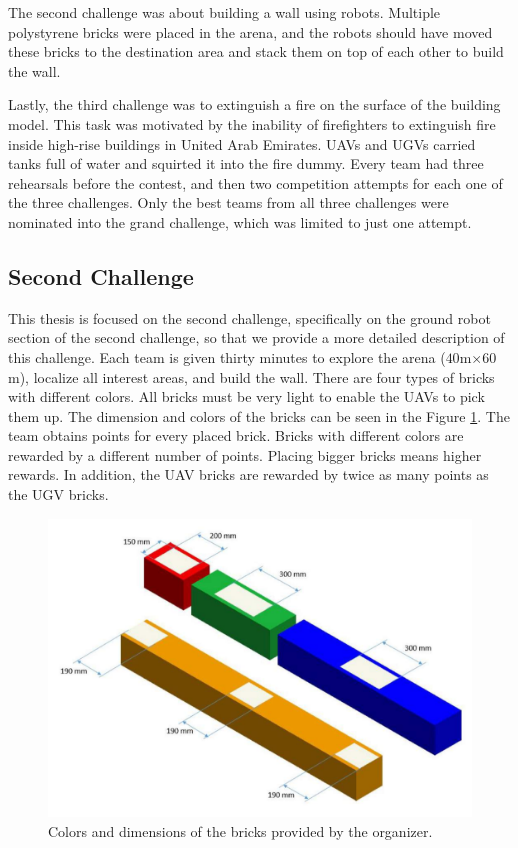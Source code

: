 The second challenge was about building a wall using robots. Multiple polystyrene bricks were placed in the arena, and the robots should have moved these bricks to the destination area and stack them on top of each other to build the wall. 

Lastly, the third challenge was to extinguish a fire on the surface of the building model. This task was motivated by the inability of firefighters to extinguish fire inside high-rise buildings in United Arab Emirates. UAVs and UGVs carried tanks full of water and squirted it into the fire dummy. Every team had three rehearsals before the contest, and then two competition attempts for each one of the three challenges. Only the best teams from all three challenges were nominated into the grand challenge, which was limited to just one attempt.

\subsection{Second Challenge}
This thesis is focused on the second challenge, specifically on the ground robot section of the second challenge, so that we provide a more detailed description of this challenge. Each team is given thirty minutes to explore the arena ($40$m$\times 60$m), localize all interest areas, and build the wall. There are four types of bricks with different colors. All bricks must be very light to enable the UAVs to pick them up. The dimension and colors of the bricks can be seen in the Figure \ref{fig:brickdef}. The team obtains points for every placed brick. Bricks with different colors are rewarded by a different number of points. Placing bigger bricks means higher rewards. In addition, the UAV bricks are rewarded by twice as many points as the UGV bricks.

\begin{figure}[H]

\centering
\includegraphics[scale=0.35]{fig/brick_sample.png}
\caption[Bricks definition]{Colors and dimensions of the bricks provided by the organizer.}
\label{fig:brickdef}

\end{figure}

